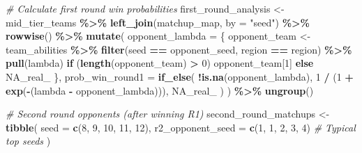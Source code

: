 \documentclass[
]{article}
\newenvironment{Shaded}{\begin{snugshade}}{\end{snugshade}}
\newcommand{\AttributeTok}[1]{\textcolor[rgb]{0.13,0.29,0.53}{#1}}
\newcommand{\CommentTok}[1]{\textcolor[rgb]{0.56,0.35,0.01}{\textit{#1}}}
\newcommand{\ConstantTok}[1]{\textcolor[rgb]{0.56,0.35,0.01}{#1}}
\newcommand{\ControlFlowTok}[1]{\textcolor[rgb]{0.13,0.29,0.53}{\textbf{#1}}}
\newcommand{\DecValTok}[1]{\textcolor[rgb]{0.00,0.00,0.81}{#1}}
\newcommand{\FunctionTok}[1]{\textcolor[rgb]{0.13,0.29,0.53}{\textbf{#1}}}
\newcommand{\NormalTok}[1]{#1}
\newcommand{\OtherTok}[1]{\textcolor[rgb]{0.56,0.35,0.01}{#1}}
\newcommand{\SpecialCharTok}[1]{\textcolor[rgb]{0.81,0.36,0.00}{\textbf{#1}}}
\newcommand{\StringTok}[1]{\textcolor[rgb]{0.31,0.60,0.02}{#1}}
\begin{document}
\begin{Shaded}
\begin{Highlighting}[]
\CommentTok{\# Calculate first round win probabilities}
\NormalTok{first\_round\_analysis }\OtherTok{\textless{}{-}}\NormalTok{ mid\_tier\_teams }\SpecialCharTok{\%\textgreater{}\%}
    \FunctionTok{left\_join}\NormalTok{(matchup\_map, }\AttributeTok{by =} \StringTok{"seed"}\NormalTok{) }\SpecialCharTok{\%\textgreater{}\%}
    \FunctionTok{rowwise}\NormalTok{() }\SpecialCharTok{\%\textgreater{}\%}
    \FunctionTok{mutate}\NormalTok{(}
        \AttributeTok{opponent\_lambda =}\NormalTok{ \{}
\NormalTok{            opponent\_team }\OtherTok{\textless{}{-}}\NormalTok{ team\_abilities }\SpecialCharTok{\%\textgreater{}\%}
                \FunctionTok{filter}\NormalTok{(seed }\SpecialCharTok{==}\NormalTok{ opponent\_seed, region }\SpecialCharTok{==}\NormalTok{ region) }\SpecialCharTok{\%\textgreater{}\%}
                \FunctionTok{pull}\NormalTok{(lambda)}
            \ControlFlowTok{if}\NormalTok{ (}\FunctionTok{length}\NormalTok{(opponent\_team) }\SpecialCharTok{\textgreater{}} \DecValTok{0}\NormalTok{) opponent\_team[}\DecValTok{1}\NormalTok{] }\ControlFlowTok{else} \ConstantTok{NA\_real\_}
\NormalTok{        \},}
        \AttributeTok{prob\_win\_round1 =} \FunctionTok{if\_else}\NormalTok{(}
            \SpecialCharTok{!}\FunctionTok{is.na}\NormalTok{(opponent\_lambda),}
            \DecValTok{1} \SpecialCharTok{/}\NormalTok{ (}\DecValTok{1} \SpecialCharTok{+} \FunctionTok{exp}\NormalTok{(}\SpecialCharTok{{-}}\NormalTok{(lambda }\SpecialCharTok{{-}}\NormalTok{ opponent\_lambda))),}
            \ConstantTok{NA\_real\_}
\NormalTok{        )}
\NormalTok{    ) }\SpecialCharTok{\%\textgreater{}\%}
    \FunctionTok{ungroup}\NormalTok{()}

\CommentTok{\# Second round opponents (after winning R1)}
\NormalTok{second\_round\_matchups }\OtherTok{\textless{}{-}} \FunctionTok{tibble}\NormalTok{(}
    \AttributeTok{seed =} \FunctionTok{c}\NormalTok{(}\DecValTok{8}\NormalTok{, }\DecValTok{9}\NormalTok{, }\DecValTok{10}\NormalTok{, }\DecValTok{11}\NormalTok{, }\DecValTok{12}\NormalTok{),}
    \AttributeTok{r2\_opponent\_seed =} \FunctionTok{c}\NormalTok{(}\DecValTok{1}\NormalTok{, }\DecValTok{1}\NormalTok{, }\DecValTok{2}\NormalTok{, }\DecValTok{3}\NormalTok{, }\DecValTok{4}\NormalTok{) }\CommentTok{\# Typical top seeds}
\NormalTok{)}


\end{Highlighting}
\end{Shaded}
\end{document}

